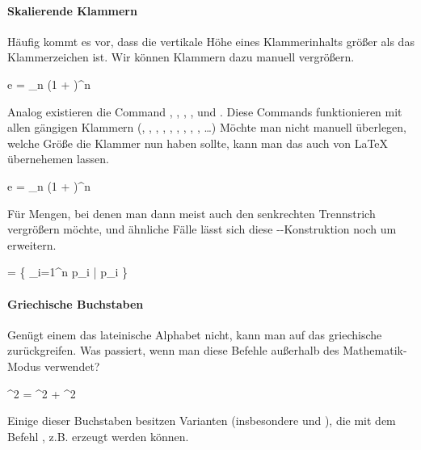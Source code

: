 \paragraph{Skalierende Klammern} Häufig kommt es vor, dass die vertikale Höhe eines Klammerinhalts größer als das Klammerzeichen ist.
Wir können Klammern dazu manuell vergrößern.
\begin{latexlisting}
	e = \lim_{n \to \infty} \bigl(1 +  \bigr)^n
\end{latexlisting}
Analog existieren die Command , , , ,  und .
Diese Commands funktionieren mit allen gängigen Klammern (\key{[}, \key{]}, \latexcommand{\{}, \latexcommand{\}}, , , \latexcommand{|}, \latexcommand{|}, \key{|}, \dots)
Möchte man nicht manuell überlegen, welche Größe die Klammer nun haben sollte, kann man das auch von \LaTeX{} übernehemen lassen.
\begin{latexlisting}
	e = \lim_{n \to \infty} \left(1 +  \right)^n
\end{latexlisting}
Für Mengen, bei denen man dann meist auch den senkrechten Trennstrich vergrößern möchte, und ähnliche Fälle lässt sich diese --Konstruktion noch um  erweitern.
\begin{latexlisting}
	 = \left\{ \prod_{i=1}^n p_i \middle| p_i \in {} \right\}
\end{latexlisting}

\paragraph{Griechische Buchstaben} Genügt einem das lateinische Alphabet nicht, kann man auf das griechische zurückgreifen.
Was passiert, wenn man diese Befehle außerhalb des Mathematik-Modus verwendet?
\begin{latexlisting}
	\alpha^2 = \beta^2 + \gamma^2 \qquad \omega \neq \Omega
\end{latexlisting}
Einige dieser Buchstaben besitzen Varianten (insbesondere  und ), die mit dem Befehl , z.B.  erzeugt werden können.

